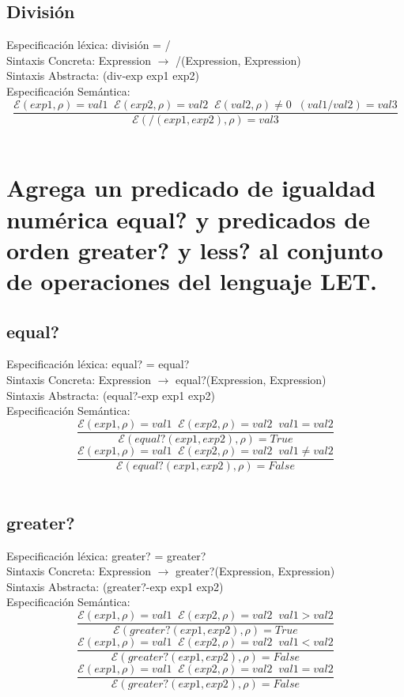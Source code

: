 \documentclass{article}
\begin{document}
\subsection{División}
Especificación léxica:
división = /
\\
Sintaxis Concreta:
Expression $\rightarrow$ /(Expression, Expression)
\\
Sintaxis Abstracta:
(div-exp exp1 exp2)
\\
Especificación Semántica:
$$\frac{\mathcal{E}(exp1, \rho) = val1 \;\; \mathcal{E}(exp2, \rho) = val2 \;\; \mathcal{E}(val2, \rho) \neq 0 \;\; (val1 / val2) = val3}{\mathcal{E} (/(exp1, exp2), \rho ) = val3}$$
\\

\section{Agrega un predicado de igualdad numérica equal? y predicados de orden greater? y
less? al conjunto de operaciones del lenguaje LET.}
\subsection{equal?}
Especificación léxica:
equal? = equal?
\\
Sintaxis Concreta:
Expression $\rightarrow$ equal?(Expression, Expression)
\\
Sintaxis Abstracta:
(equal?-exp exp1 exp2)
\\
Especificación Semántica:
$$\frac{\mathcal{E} (exp1, \rho) = val1 \;\; \mathcal{E} (exp2, \rho) = val2 \;\; val1 = val2}{\mathcal{E} (equal?(exp1, exp2), \rho ) = True}$$
$$\frac{\mathcal{E} (exp1, \rho) = val1 \;\; \mathcal{E} (exp2, \rho) = val2 \;\; val1 \neq val2}{\mathcal{E} (equal?(exp1, exp2), \rho ) = False}$$
\\
\subsection{greater?}
Especificación léxica:
greater? = greater?
\\
Sintaxis Concreta:
Expression $\rightarrow$ greater?(Expression, Expression)
\\
Sintaxis Abstracta:
(greater?-exp exp1 exp2)
\\
Especificación Semántica:
$$\frac{\mathcal{E} (exp1, \rho) = val1 \;\; \mathcal{E} (exp2, \rho) = val2 \;\; val1 > val2}{\mathcal{E} (greater?(exp1, exp2), \rho ) = True}$$
$$\frac{\mathcal{E} (exp1, \rho) = val1 \;\; \mathcal{E} (exp2, \rho) = val2 \;\; val1 < val2}{\mathcal{E} (greater?(exp1, exp2), \rho ) = False}$$
$$\frac{\mathcal{E} (exp1, \rho) = val1 \;\; \mathcal{E} (exp2, \rho) = val2 \;\; val1 = val2}{\mathcal{E} (greater?(exp1, exp2), \rho ) = False}$$
\\
\end{document}
